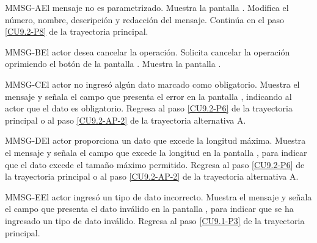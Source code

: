 	
	\begin{UCtrayectoriaA}{MMSG-A}{El mensaje no es parametrizado.}
		\UCpaso[\UCsist] Muestra la pantalla .
		\UCpaso[\UCactor] Modifica el número, nombre, descripción y redacción del mensaje. \label{CU9.2-AP-2}
		\UCpaso[\UCsist] Continúa en el paso \ref{CU9.2-P8} de la trayectoria principal.
	\end{UCtrayectoriaA}


	\begin{UCtrayectoriaA}{MMSG-B}{El actor desea cancelar la operación.}
		\UCpaso[\UCactor] Solicita cancelar la operación oprimiendo el botón  de la pantalla .
		\UCpaso[\UCsist] Muestra la pantalla .
	\end{UCtrayectoriaA}

	\begin{UCtrayectoriaA}{MMSG-C}{El actor no ingresó algún dato marcado como obligatorio.}
		\UCpaso[\UCsist] Muestra el mensaje  y señala el campo que presenta el error en la pantalla , indicando al actor que el dato es obligatorio.
		\UCpaso Regresa al paso \ref{CU9.2-P6} de la trayectoria principal o al paso \ref{CU9.2-AP-2} de la trayectoria alternativa A.
	\end{UCtrayectoriaA}

	\begin{UCtrayectoriaA}{MMSG-D}{El actor proporciona un dato que excede la longitud máxima.}
		\UCpaso[\UCsist] Muestra el mensaje  y señala el campo que excede la longitud en la pantalla , para indicar que el dato excede el tamaño máximo permitido.
		\UCpaso Regresa al paso \ref{CU9.2-P6} de la trayectoria principal o al paso \ref{CU9.2-AP-2} de la trayectoria alternativa A.
	\end{UCtrayectoriaA}

	\begin{UCtrayectoriaA}{MMSG-E}{El actor ingresó un tipo de dato incorrecto.}
		\UCpaso[\UCsist] Muestra el mensaje  y señala el campo que presenta el dato inválido en la pantalla , para indicar que se ha ingresado un tipo de dato inválido.
		\UCpaso Regresa al paso \ref{CU9.1-P3} de la trayectoria principal.
	\end{UCtrayectoriaA}

